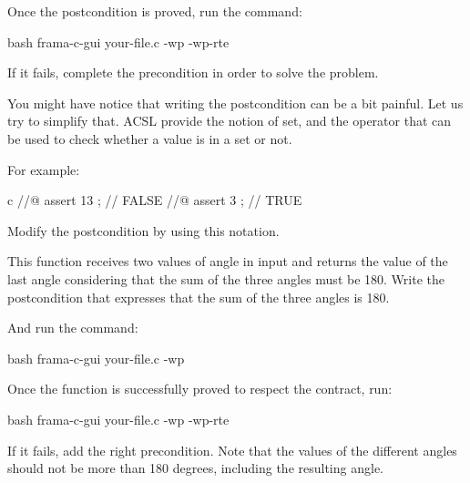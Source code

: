 Once the postcondition is proved, run the command:



\begin{CodeBlock}{bash}
frama-c-gui your-file.c -wp -wp-rte
\end{CodeBlock}



If it fails, complete the precondition in order to solve the problem.



You might have notice that writing the postcondition can be a bit painful.
Let us try to simplify that. ACSL provide the notion of set, and the operator
 that can be used to check whether a value is
in a set or not.


For example:


\begin{CodeBlock}{c}
//@ assert 13  ; // FALSE
//@ assert 3   ; // TRUE
\end{CodeBlock}



Modify the postcondition by using this notation.






This function receives two values of angle in input and returns the value
of the last angle considering that the sum of the three angles must be 180.
Write the postcondition that expresses that the sum of the three angles is
180.





And run the command:


\begin{CodeBlock}{bash}
frama-c-gui your-file.c -wp
\end{CodeBlock}


Once the function is successfully proved to respect the contract, run:


\begin{CodeBlock}{bash}
frama-c-gui your-file.c -wp -wp-rte
\end{CodeBlock}



If it fails, add the right precondition. Note that the values of the different
angles should not be more than 180 degrees, including the resulting angle.
